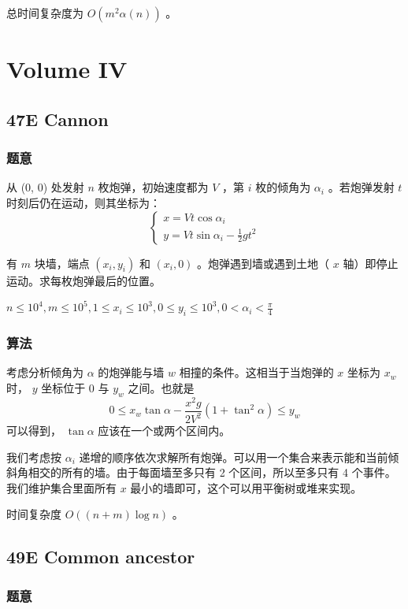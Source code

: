 \documentclass[11pt]{article}
\begin{document}
     总时间复杂度为 $O(m^2 \alpha (n))$ 。
\section{Volume IV}
\label{sec-4}
\subsection{47E   Cannon}
\label{sec-4-1}
\subsubsection{题意}
\label{sec-4-1-1}

    从 (0, 0) 处发射 $n$ 枚炮弹，初始速度都为 $V$ ，第 $i$ 枚的倾角为 $\alpha_i$ 。若炮弹发射 $t$ 时刻后仍在运动，则其坐标为：
    $$\begin{cases} x = V t \cos \alpha_i \\ y = V t \sin \alpha_i - \frac{1}{2} g t^2 \end{cases}$$

    有 $m$ 块墙，端点 $(x_i, y_i)$ 和 $(x_i, 0)$ 。炮弹遇到墙或遇到土地（ $x$ 轴）即停止运动。求每枚炮弹最后的位置。

    $n \leq 10^4, m \leq 10^5, 1 \leq x_i \leq 10^3, 0 \leq y_i \leq 10^3, 0 < \alpha_i < \frac{\pi}{4}$ 
\subsubsection{算法}
\label{sec-4-1-2}


    考虑分析倾角为 $\alpha$ 的炮弹能与墙 $w$ 相撞的条件。这相当于当炮弹的 $x$ 坐标为 $x_w$ 时， $y$ 坐标位于 0 与 $y_w$ 之间。也就是
    $$0 \leq x_w \tan \alpha - \frac{x^2 g}{2V^2} (1 + \tan^2 \alpha) \leq y_w$$
    可以得到， $\tan\alpha$ 应该在一个或两个区间内。

    我们考虑按 $\alpha_i$ 递增的顺序依次求解所有炮弹。可以用一个集合来表示能和当前倾斜角相交的所有的墙。由于每面墙至多只有 2 个区间，所以至多只有 4 个事件。我们维护集合里面所有 $x$ 最小的墙即可，这个可以用平衡树或堆来实现。

    时间复杂度 $O((n + m) \log n)$ 。
\subsection{49E   Common ancestor}
\label{sec-4-2}
\subsubsection{题意}
\label{sec-4-2-1}
\end{document}
